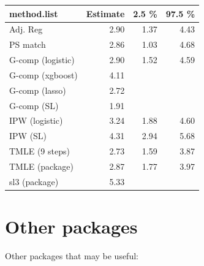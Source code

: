\documentclass[
]{book}
\begin{document}
\begin{tabular}{l|r|r|r}
\hline
method.list & Estimate & 2.5 \% & 97.5 \%\\
\hline
Adj. Reg & 2.90 & 1.37 & 4.43\\
\hline
PS match & 2.86 & 1.03 & 4.68\\
\hline
G-comp (logistic) & 2.90 & 1.52 & 4.59\\
\hline
G-comp (xgboost) & 4.11 &  & \\
\hline
G-comp (lasso) & 2.72 &  & \\
\hline
G-comp (SL) & 1.91 &  & \\
\hline
IPW (logistic) & 3.24 & 1.88 & 4.60\\
\hline
IPW (SL) & 4.31 & 2.94 & 5.68\\
\hline
TMLE (9 steps) & 2.73 & 1.59 & 3.87\\
\hline
TMLE (package) & 2.87 & 1.77 & 3.97\\
\hline
sl3 (package) & 5.33 &  & \\
\hline
\end{tabular}

\hypertarget{other-packages}{%
\section{Other packages}\label{other-packages}}

Other packages that may be useful:
\end{document}
